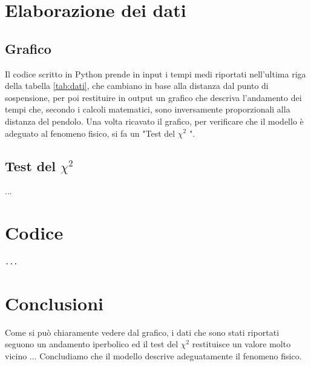 \documentclass[a4paper]{article}
\begin{document}
    
    \section{Elaborazione dei dati}
    
    \subsection{Grafico}
        Il codice scritto in Python prende in input i tempi medi riportati nell'ultima riga della tabella \ref{tab:dati}, che cambiano in base alla distanza dal punto di sospensione, per poi restituire in output un grafico che descriva l'andamento dei tempi che, secondo i calcoli matematici, sono inversamente proporzionali alla distanza del pendolo. Una volta ricavato il grafico, per verificare che il modello è adeguato al fenomeno fisico, si fa un "Test del $\chi^2$ ".
    
    \subsection{Test del $\chi^2$}
        ...

    \section{Codice}
    
    \begin{lstlisting}[language=Python, caption=Codice]
        ...
    \end{lstlisting}
    
    \section{Conclusioni}
        Come si può chiaramente vedere dal grafico, i dati che sono stati riportati seguono un andamento iperbolico ed il test del $\chi^2$ restituisce un valore molto vicino ... Concludiamo che il modello descrive adeguatamente il fenomeno fisico.
        
\end{document}
